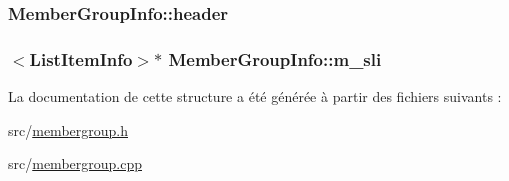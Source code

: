 \subsubsection[{header}]{ Member\+Group\+Info\+::header}\label{struct_member_group_info_ae9064c66b617952b9c0f924ef30ce226}
\hypertarget{struct_member_group_info_ab8d0845ef9ecaa1d3d09374098316fca}{}
\subsubsection[{m\+\_\+sli}]{$<${\bf List\+Item\+Info}$>$$\ast$ Member\+Group\+Info\+::m\+\_\+sli}\label{struct_member_group_info_ab8d0845ef9ecaa1d3d09374098316fca}


La documentation de cette structure a été générée à partir des fichiers suivants \+:\begin{DoxyCompactItemize}
\item 
src/\hyperlink{membergroup_8h}{membergroup.\+h}\item 
src/\hyperlink{membergroup_8cpp}{membergroup.\+cpp}\end{DoxyCompactItemize}
